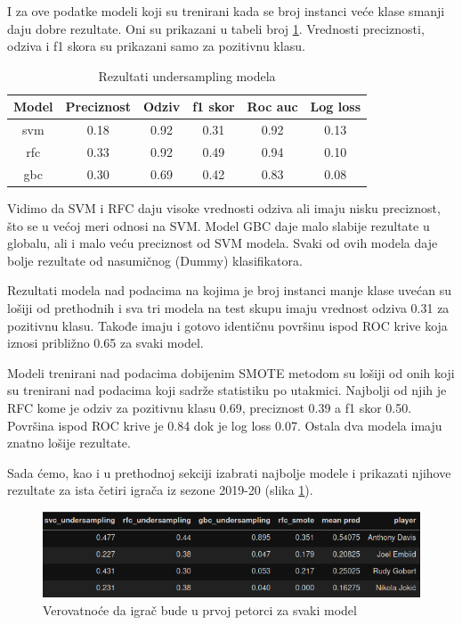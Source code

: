 \documentclass[a4paper]{article}
\begin{document}
I za ove podatke modeli koji su trenirani kada se broj instanci veće klase smanji daju dobre rezultate. Oni su prikazani u tabeli broj \ref{tab:undersampling_pp}. Vrednosti preciznosti, odziva i f1 skora su prikazani samo za pozitivnu klasu.

\begin{table}[!h]
\begin{center}
\begin{tabular}{|c|c|c|c|c|c|} \hline
\textbf{Model} & \textbf{Preciznost} & \textbf{Odziv} & \textbf{f1 skor} & \textbf{Roc auc} & \textbf{Log loss} \\ \hline
svm & 0.18 & 0.92 & 0.31 & 0.92 & 0.13 \\ \hline
rfc & 0.33 & 0.92 & 0.49 & 0.94 & 0.10 \\ \hline
gbc & 0.30 & 0.69 & 0.42 & 0.83 & 0.08 \\ \hline
\end{tabular}
\caption{Rezultati undersampling modela}
\label{tab:undersampling_pp}
\end{center}
\end{table}

Vidimo da SVM i RFC daju visoke vrednosti odziva ali imaju nisku preciznost, što se u većoj meri odnosi na SVM. Model GBC daje malo slabije rezultate u globalu, ali i malo veću preciznost od SVM modela. Svaki od ovih modela daje bolje rezultate od nasumičnog (Dummy) klasifikatora.

Rezultati modela nad podacima na kojima je broj instanci manje klase uvećan su lošiji od prethodnih i sva tri modela na test skupu imaju vrednost odziva 0.31 za pozitivnu klasu. Takođe imaju i gotovo identičnu površinu ispod ROC krive koja iznosi približno 0.65 za svaki model.

Modeli trenirani nad podacima dobijenim SMOTE metodom su lošiji od onih koji su trenirani nad podacima koji sadrže statistiku po utakmici. Najbolji od njih je RFC kome je odziv za pozitivnu klasu 0.69, preciznost 0.39 a f1 skor 0.50. Površina ispod ROC krive je 0.84 dok je log loss 0.07. Ostala dva modela imaju znatno lošije rezultate.

Sada ćemo, kao i u prethodnoj sekciji izabrati najbolje modele i prikazati njihove rezultate za ista četiri igrača iz sezone 2019-20 (slika \ref{plt:clf_pp}).

\begin{figure}[h!]
\begin{center}
\includegraphics[scale=0.50]{clf_pp.png}
\end{center}
\caption{Verovatnoće da igrač bude u prvoj petorci za svaki model}
\label{plt:clf_pp}
\end{figure}
\end{document}
